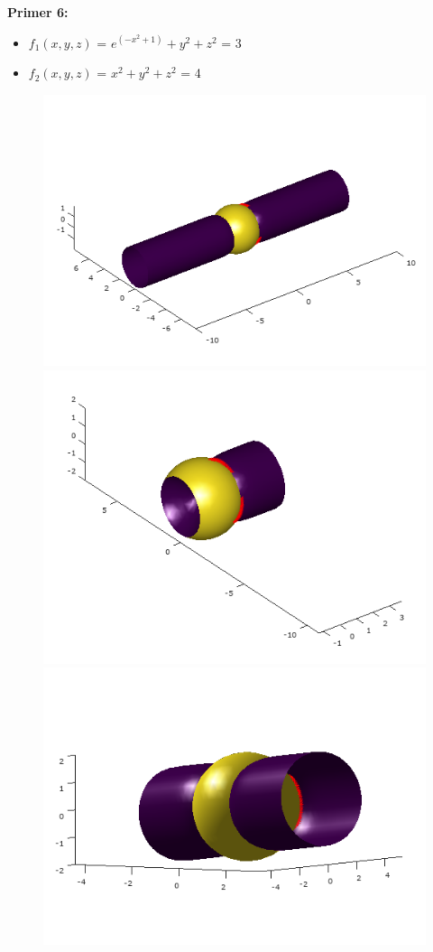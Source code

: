 \documentclass[12pt]{article}
\begin{document}
	\begin{minipage}{\textwidth}
	\textbf{\large{Primer 6:}}
	\begin{itemize}  
		\item $f_{1}(x,y,z)$ = $e^{(-x^{2}+1)}+y^{2}+z^{2}$ = 3
		\item $f_{2}(x,y,z)$ = $x^2 + y^2 + z^2$ = 4
	\end{itemize}
	\begin{figure}[H]
    	\centering
	    \includegraphics[scale=0.5]{primer6_1}
	    \includegraphics[scale=0.5]{primer6_2}
    	\includegraphics[scale=0.5]{primer6_3}

\end{figure}
\end{minipage}
\end{document}
